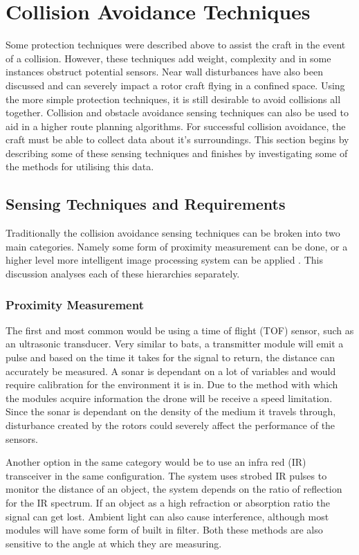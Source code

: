 	
	
\section{Collision Avoidance Techniques}
Some protection techniques were described above to assist the craft in the event of a collision. However, these techniques add weight, complexity and in some instances obstruct potential sensors. Near wall disturbances have also been discussed and can severely impact a rotor craft flying in a confined space. Using the more simple protection techniques, it is still desirable to avoid collisions all together. Collision and obstacle avoidance sensing techniques can also be used to aid in a higher route planning algorithms. For successful collision avoidance, the craft must be able to collect data about it's surroundings. This section begins by describing some of these sensing techniques and finishes by investigating some of the methods for utilising this data.

	\subsection{Sensing Techniques and Requirements}
	Traditionally the collision avoidance sensing techniques can be broken into two main categories. Namely some form of proximity measurement can be done, or a higher level more intelligent image processing system can be applied \cite{Green2015}. This discussion analyses each of these hierarchies separately.
	
		\subsubsection{Proximity Measurement}		
		The first and most common would be using a time of flight (TOF) sensor, such as an ultrasonic transducer. Very similar to bats, a transmitter module will emit a pulse and based on the time it takes for the signal to return, the distance can accurately be measured. A sonar is dependant on a lot of variables and would require calibration for the environment it is in. Due to the method with which the modules acquire information the drone will be receive a speed limitation. Since the sonar is dependant on the density of the medium it travels through, disturbance created by the rotors could severely affect the performance of the sensors.
		
		Another option in the same category would be to use an infra red (IR) transceiver in the same configuration. The system uses strobed IR pulses to monitor the distance of an object, the system depends on the ratio of reflection for the IR spectrum. If an object as a high refraction or absorption ratio the signal can get lost. Ambient light can also cause interference, although most modules will have some form of built in filter. Both these methods are also sensitive to the angle at which they are measuring. 
		
